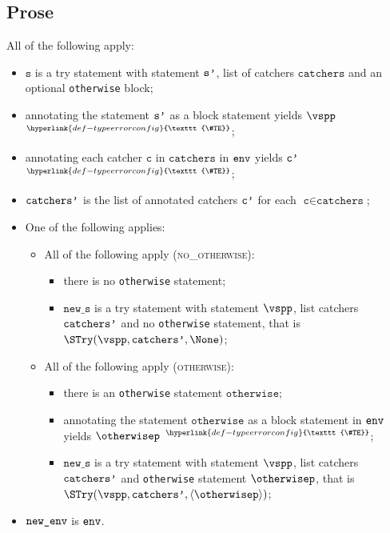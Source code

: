\documentclass{book}
\newcommand\TypeErrorConfig[0]{\hyperlink{def-typeerrorconfig}{\texttt{\#TE}}}
\newcommand\ProseOrTypeError[0]{\hyperlink{def-proseortypeerror}{$^{\TypeErrorConfig}$}}
\newcommand\vc[0]{\texttt{c}}
\newcommand\vs[0]{\texttt{s}}
\newcommand\news[0]{\texttt{new\_s}}
\newcommand\catchers[0]{\texttt{catchers}}
\newcommand\otherwise[0]{\texttt{otherwise}}
\begin{document}
\subsection{Prose}
All of the following apply:
\begin{itemize}
  \item $\vs$ is a try statement with statement $\texttt{s'}$, list of catchers $\catchers$ and an optional \texttt{otherwise} block;
  \item annotating the statement $\texttt{s'}$ as a block statement yields $\vspp$ \ProseOrTypeError;
  \item annotating each catcher $\vc$ in $\catchers$ in $\texttt{env}$ yields $\texttt{c'}$ \ProseOrTypeError;
  \item $\texttt{catchers'}$ is the list of annotated catchers $\texttt{c'}$ for each $\vc\in\catchers$;
  \item One of the following applies:
  \begin{itemize}
    \item All of the following apply (\textsc{no\_otherwise}):
    \begin{itemize}
      \item there is no \texttt{otherwise} statement;
      \item $\news$ is a try statement with statement $\vspp$, list catchers $\texttt{catchers'}$ and no \texttt{otherwise} statement,
            that is \\
            $\STry(\vspp, \catchersp, \None)$;
    \end{itemize}

    \item All of the following apply (\textsc{otherwise}):
    \begin{itemize}
      \item there is an \texttt{otherwise} statement $\otherwise$;
      \item annotating the statement $\otherwise$ as a block statement in $\texttt{env}$ yields $\otherwisep$ \ProseOrTypeError;
      \item $\news$ is a try statement with statement $\vspp$, list catchers $\texttt{catchers'}$ and \texttt{otherwise} statement
            $\otherwisep$, that is \\
            $\STry(\vspp, \catchersp, \langle\otherwisep\rangle)$;
    \end{itemize}
  \end{itemize}
  \item $\texttt{new\_env}$ is $\texttt{env}$.
\end{itemize}
\end{document}
